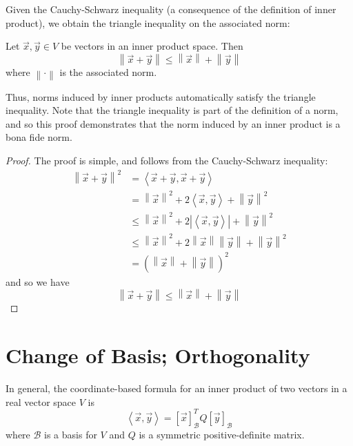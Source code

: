 Given the Cauchy-Schwarz inequality (a consequence of the definition of inner product), we obtain the triangle inequality on the associated norm:
\begin{theorem}
Let $\vec{x}, \vec{y} \in V$ be vectors in an inner product space. Then \[ \left\lVert \vec{x} + \vec{y} \right\rVert \leq  \left\lVert \vec{x} \right\rVert + \left\lVert \vec{y} \right\rVert \] where $\left\lVert \cdot \right\rVert $ is the associated norm.
\end{theorem}
Thus, norms induced by inner products automatically satisfy the triangle inequality. Note that the triangle inequality is part of the definition of a norm, and so this proof demonstrates that the norm induced by an inner product is a bona fide norm.
\begin{proof}
The proof is simple, and follows from the Cauchy-Schwarz inequality:
\begin{align*}
	\left\lVert \vec{x} + \vec{y} \right\rVert^2 & = \left\langle \vec{x}+\vec{y}, \vec{x}+\vec{y} \right\rangle \\
	& = \left\lVert \vec{x} \right\rVert^2 + 2\left\langle \vec{x}, \vec{y} \right\rangle + \left\lVert \vec{y} \right\rVert^2 \\
	& \leq \left\lVert \vec{x} \right\rVert^2 + 2\left| \left\langle \vec{x}, \vec{y} \right\rangle \right| + \left\lVert \vec{y} \right\rVert^2 \\
	& \leq \left\lVert \vec{x} \right\rVert^2 + 2\left\lVert \vec{x} \right\rVert \left\lVert \vec{y} \right\rVert  + \left\lVert \vec{y} \right\rVert^2 \\
	& = \left( \left\lVert \vec{x} \right\rVert + \left\lVert \vec{y}\right\rVert \right)^2
\end{align*}
and so we have \[ \left\lVert \vec{x}+\vec{y} \right\rVert \leq \left\lVert \vec{x} \right\rVert + \left\lVert \vec{y} \right\rVert \]
\end{proof}







\section{Change of Basis; Orthogonality}
In general, the coordinate-based formula for an inner product of two vectors in a real vector space $V$ is \[ \left\langle \vec{x}, \vec{y} \right\rangle = \left[ \vec{x}\right]_{\mathcal{B}}^T Q \left[ \vec{y} \right]_{\mathcal{B}} \] where $\mathcal{B}$ is a basis for $V$ and $Q$ is a symmetric positive-definite matrix. 

